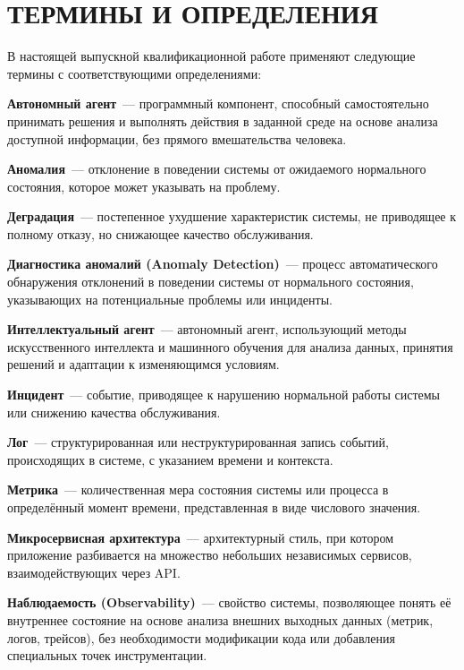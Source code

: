 \chapter*{ТЕРМИНЫ И ОПРЕДЕЛЕНИЯ}

В настоящей выпускной квалификационной работе применяют следующие термины с соответствующими определениями:

\begin{sloppypar}

\textbf{Автономный агент}~--- программный компонент, способный самостоятельно принимать решения и выполнять действия в заданной среде на основе анализа доступной информации, без прямого вмешательства человека.

\textbf{Аномалия}~--- отклонение в поведении системы от ожидаемого нормального состояния, которое может указывать на проблему.

\textbf{Деградация}~--- постепенное ухудшение характеристик системы, не приводящее к полному отказу, но снижающее качество обслуживания.

\textbf{Диагностика аномалий (Anomaly Detection)}~--- процесс автоматического обнаружения отклонений в поведении системы от нормального состояния, указывающих на потенциальные проблемы или инциденты.

\textbf{Интеллектуальный агент}~--- автономный агент, использующий методы искусственного интеллекта и машинного обучения для анализа данных, принятия решений и адаптации к изменяющимся условиям.

\textbf{Инцидент}~--- событие, приводящее к нарушению нормальной работы системы или снижению качества обслуживания.

\textbf{Лог}~--- структурированная или неструктурированная запись событий, происходящих в системе, с указанием времени и контекста.

\textbf{Метрика}~--- количественная мера состояния системы или процесса в определённый момент времени, представленная в виде числового значения.

\textbf{Микросервисная архитектура}~--- архитектурный стиль, при котором приложение разбивается на множество небольших независимых сервисов, взаимодействующих через API.

\textbf{Наблюдаемость (Observability)}~--- свойство системы, позволяющее понять её внутреннее состояние на основе анализа внешних выходных данных (метрик, логов, трейсов), без необходимости модификации кода или добавления специальных точек инструментации.


\end{sloppypar}

